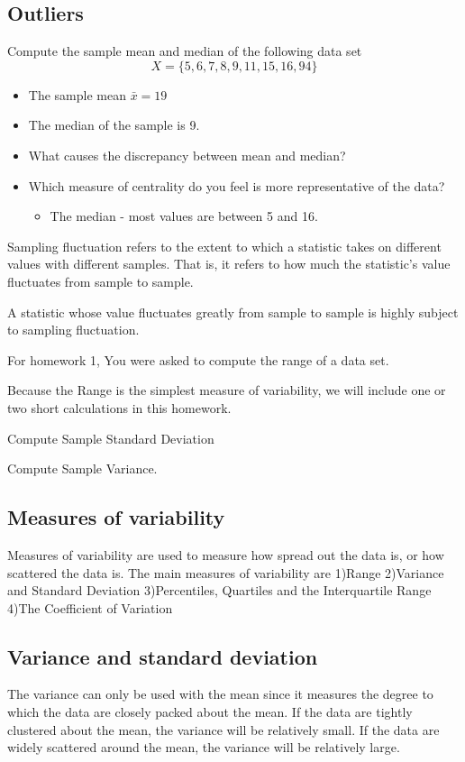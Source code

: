\documentclass[]{report}
\begin{document}
{\subsection{Outliers}
Compute the sample mean and median of the following data set
\[X = \{ 5, 6, 7, 8 ,9,11, 15, 16, 94\}\]

\begin{itemize}
\item The sample mean $\bar{x} = 19$
\item The median of the sample is 9.
\item What causes the discrepancy between mean and median?

\item Which measure of centrality do you feel is more representative of the data?
\begin{itemize}
\item The median  - most values are between 5 and 16.
\end{itemize}
\end{itemize}

}

Sampling fluctuation refers to the extent to which a statistic takes on different values with different samples. That is, it refers to how much the statistic's value fluctuates from sample to sample.

A statistic whose value fluctuates greatly from sample to sample is highly subject to sampling fluctuation.





For homework 1, You were asked to compute the range of a data set.

Because the Range is the simplest measure of variability, we will include one or two short calculations in this homework. 

Compute Sample Standard Deviation

Compute Sample Variance.

\subsection{Measures of variability}
Measures of variability are used to measure how spread out the data is, or how scattered the data is. The main measures of variability are
1)Range
2)Variance and Standard Deviation
3)Percentiles, Quartiles and the Interquartile Range
4)The Coefficient of Variation


\subsection{Variance and standard deviation}
The variance can only be used with the mean since it measures the degree to which the data are closely packed about the mean. If the data are tightly clustered about the mean, the variance will be relatively small. If the data are widely scattered around the mean, the variance will be relatively large.
\end{document}
